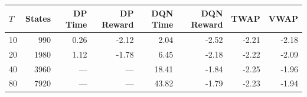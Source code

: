 \begin{tabular}{lrrrrrrr}
\hline
$T$ & States & DP Time & DP Reward & DQN Time & DQN Reward & TWAP & VWAP \\
\hline
10 & 990 & 0.26 & -2.12 & 2.04 & -2.52 & -2.21 & -2.18 \\
20 & 1980 & 1.12 & -1.78 & 6.45 & -2.18 & -2.22 & -2.09 \\
40 & 3960 & --- & --- & 18.41 & -1.84 & -2.25 & -1.96 \\
80 & 7920 & --- & --- & 43.82 & -1.79 & -2.23 & -1.94 \\
\hline
\end{tabular}